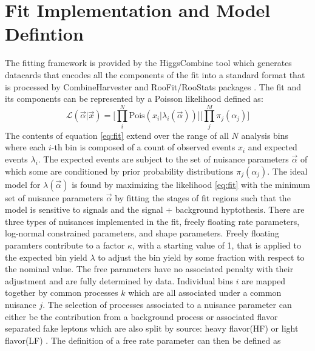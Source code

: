 




\section{Fit Implementation and Model Defintion}
The fitting framework is provided by the HiggsCombine tool which generates datacards that encodes all the components of the fit into a standard format that is processed by CombineHarvester and RooFit/RooStats packages \cite{Antcheva:2009zz}\cite{moneta2011roostats}. The fit and its components can be represented by a Poisson likelihood defined as:
\begin{equation}
\label{eq:fit}
\mathcal{L}(\vec{\alpha}|\vec{x}) = \bigg[ \prod_i^N \text{Pois}(x_i|\lambda_i(\vec{\alpha})) \bigg] \bigg[\prod_j^M \pi_j(\alpha_j) \bigg]
\end{equation}
The contents of equation \ref{eq:fit} extend over the range of all $N$ analysis bins where each $i$-th bin is composed of a count of observed events $x_i$ and expected events $\lambda_i$. The expected events are subject to the set of nuisance parameters $\vec{\alpha}$ of which some are conditioned by prior probability distributions $\pi_j(\alpha_j)$. The ideal model for $\lambda(\vec{\alpha})$ is found by maximizing the likelihood \ref{eq:fit} with the minimum set of nuisance parameters $\vec{\alpha}$ by fitting the stages of fit regions such that the model is sensitive to signals and the signal + background hyptothesis.  There are three types of nuisances implemented in the fit, freely floating rate parameters, log-normal constrained parameters, and shape parameters.  Freely floating paramters contribute to a factor $\kappa$, with a starting value of 1,  that is applied to the expected bin yield $\lambda$ to adjust the bin yield by some fraction with respect to the nominal value. The free parameters have no associated penalty with their adjustment and are fully determined by data. Individual bins $i$ are mapped together by common processes $k$ which are all associated under a common nuisance $j$. The selection of processes associated to a nuisance parameter can either be the contribution from a background process or associated flavor separated fake leptons which are also split by source: heavy flavor(HF) or light flavor(LF) . The definition of a free rate parameter can then be defined as 
